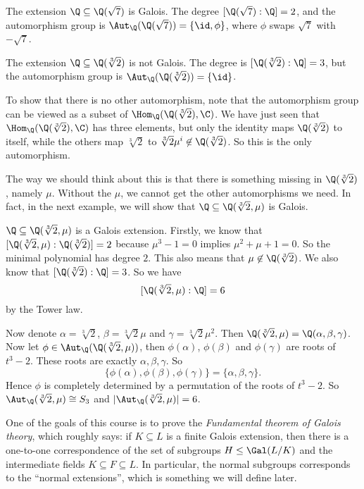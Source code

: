\documentclass[a4paper]{article}
\begin{document}
\begin{eg}
  The extension $\Q\subseteq \Q(\sqrt{7})$ is Galois. The degree $[\Q(\sqrt{7}):\Q] = 2$, and the automorphism group is $\Aut_\Q(\Q(\sqrt{7})) = \{\id, \phi\}$, where $\phi$ swaps $\sqrt{7}$ with $-\sqrt{7}$.
\end{eg}

\begin{eg}
  The extension $\Q\subseteq \Q(\sqrt[3]{2})$ is not Galois. The degree is $[\Q(\sqrt[3]{2}):\Q] = 3$, but the automorphism group is $\Aut_\Q(\Q(\sqrt[3]{2})) = \{\id\}$.

  To show that there is no other automorphism, note that the automorphism group can be viewed as a subset of $\Hom_\Q(\Q(\sqrt[3]{2}), \C)$. We have just seen that $\Hom_\Q(\Q(\sqrt[3]{2}), \C)$ has three elements, but only the identity maps $\Q(\sqrt[3]{2})$ to itself, while the others map $\sqrt[3]{2}$ to $\sqrt[3]{2}\mu^i \not\in \Q(\sqrt[3]{2})$. So this is the only automorphism.

  The way we should think about this is that there is something missing in $\Q(\sqrt[3]{2})$, namely $\mu$. Without the $\mu$, we cannot get the other automorphisms we need. In fact, in the next example, we will show that $\Q\subseteq \Q(\sqrt[3]{2}, \mu)$ is Galois.
\end{eg}

\begin{eg}
  $\Q\subseteq \Q(\sqrt[3]{2},\mu)$ is a Galois extension. Firstly, we know that $[\Q(\sqrt[3]{2}, \mu): \Q(\sqrt[3]{2})] = 2$ because $\mu^3 - 1 = 0$ implies $\mu^2 + \mu + 1 = 0$. So the minimal polynomial has degree $2$. This also means that $\mu \not\in \Q(\sqrt[3]{2})$. We also know that $[\Q(\sqrt[3]{2}): \Q] = 3$. So we have
  \[
    [\Q(\sqrt[3]{2}, \mu): \Q] = 6
  \]
  by the Tower law.

  Now denote $\alpha = \sqrt[3]{2}$, $\beta = \sqrt[3]{2}\mu$ and $\gamma = \sqrt[3]{2}\mu^2$. Then $\Q(\sqrt[3]{2}, \mu) = \Q(\alpha, \beta, \gamma)$. Now let $\phi \in \Aut_\Q(\Q(\sqrt[3]{2}, \mu))$, then $\phi(\alpha)$, $\phi(\beta)$ and $\phi(\gamma)$ are roots of $t^3 - 2$. These roots are exactly $\alpha, \beta, \gamma$. So
  \[
    \{\phi(\alpha), \phi(\beta), \phi(\gamma)\} = \{\alpha, \beta, \gamma\}.
  \]
  Hence $\phi$ is completely determined by a permutation of the roots of $t^3 - 2$. So $\Aut_\Q(\sqrt[3]{2}, \mu) \cong S_3$ and $|\Aut_\Q(\sqrt[3]{2}, \mu)| = 6$.
\end{eg}

One of the goals of this course is to prove the \emph{Fundamental theorem of Galois theory}, which roughly says: if $K\subseteq L$ is a finite Galois extension, then there is a one-to-one correspondence of the set of subgroups $H\leq \Gal(L/K)$ and the intermediate fields $K\subseteq F \subseteq L$. In particular, the normal subgroups corresponds to the ``normal extensions'', which is something we will define later.
\end{document}
